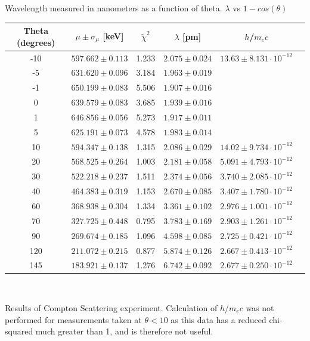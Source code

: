 \documentclass{article}
\begin{document}
\begin{center}
\caption[5]{ Wavelength measured in nanometers as a function of theta. $\lambda$ vs $1-cos(\theta)$} \vspace{5mm}

\begin{tabular}{| c | c | c | c | c | c |}
    \hline
     Theta (degrees) & $\mu \pm \sigma_{\mu}$ [keV] & $\widetilde\chi^{2}$ & $\lambda$ [pm] & $h$/$m_{e}c$ \\
     \hline
     -10 & $597.662 \pm 0.113$ & 1.233 & $2.075 \pm 0.024$ & $13.63 \pm 8.131 \cdot 10^{-12}$ \\
     \hline
     -5 & $631.620 \pm 0.096$ & 3.184 & $1.963 \pm 0.019$ &  \\
     \hline
     -1 & $650.199 \pm 0.083$ & 5.506 & $1.907 \pm 0.016$ &  \\
     \hline
     0 & $639.579 \pm 0.083$ & 3.685 & $1.939 \pm 0.016$ &  \\
     \hline
     1 & $646.856 \pm 0.056$ & 5.273 & $1.917 \pm 0.011$ &  \\
     \hline
     5 & $625.191 \pm 0.073$ & 4.578 & $1.983 \pm 0.014$ &  \\
     \hline
     10 & $594.347 \pm 0.138$ & 1.315 & $2.086 \pm 0.029$ & $14.02 \pm 9.734 \cdot 10^{-12}$ \\
     \hline
     20 & $568.525 \pm 0.264$ & 1.003 & $2.181 \pm 0.058$ & $5.091 \pm 4.793 \cdot 10^{-12}$ \\
     \hline
     30 & $522.218 \pm 0.237$ & 1.511 & $2.374 \pm 0.056$ & $3.740 \pm 2.085 \cdot 10^{-12}$ \\
     \hline
     40 & $464.383 \pm 0.319$ & 1.153 & $2.670 \pm 0.085$ & $3.407 \pm 1.780 \cdot 10^{-12}$ \\
     \hline
     60 & $368.938 \pm 0.304$ & 1.334 & $3.361 \pm 0.102$ & $2.976 \pm 1.001 \cdot 10^{-12}$ \\
     \hline
     70 & $327.725 \pm 0.448$ & 0.795 & $3.783 \pm 0.169$ & $2.903 \pm 1.261 \cdot 10^{-12}$ \\
     \hline
     90 & $269.674 \pm 0.185$ & 1.096 & $4.598 \pm 0.085$ & $2.725 \pm 0.421 \cdot 10^{-12}$ \\
     \hline
     120 & $211.072 \pm 0.215$ & 0.877 & $5.874 \pm 0.126$ & $2.667 \pm 0.413 \cdot 10^{-12}$ \\
     \hline
     145 & $183.921 \pm 0.137$ & 1.276 & $6.742 \pm 0.092$ & $2.677 \pm 0.250 \cdot 10^{-12}$ \\
     \hline
     
\end{tabular} \\ \vspace{4mm}
\caption[6]{ Results of Compton Scattering experiment. Calculation of $h$/$m_{e}c$ was not performed for measurements taken at $\theta<10$ as this data has a reduced chi-squared much greater than 1, and is therefore not useful.}

\end{center}
\end{document}
